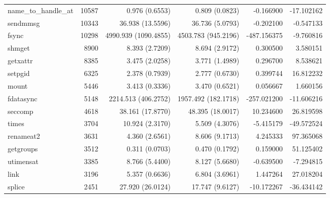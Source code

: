 \begin{longtable}{>{\ttfamily}lrrrrr}
           name\_to\_handle\_at &       10587 &           0.976 (0.6553) &           0.809 (0.0823) &       -0.166900 &   -17.102162 \\
                       sendmmsg &       10343 &         36.938 (13.5596) &          36.736 (5.0793) &       -0.202100 &    -0.547133 \\
                          fsync &       10298 &     4990.939 (1090.4855) &      4503.783 (945.2196) &     -487.156375 &    -9.760816 \\
                         shmget &        8900 &           8.393 (2.7209) &           8.694 (2.9172) &        0.300500 &     3.580151 \\
                       getxattr &        8385 &           3.475 (2.0258) &           3.771 (1.4989) &        0.296700 &     8.538621 \\
                        setpgid &        6325 &           2.378 (0.7939) &           2.777 (0.6730) &        0.399744 &    16.812232 \\
                          mount &        5446 &           3.413 (0.3336) &           3.470 (0.6521) &        0.056667 &     1.660156 \\
                      fdatasync &        5148 &      2214.513 (406.2752) &      1957.492 (182.1718) &     -257.021200 &   -11.606216 \\
                        seccomp &        4618 &         38.161 (17.8770) &         48.395 (18.0017) &       10.234600 &    26.819598 \\
                          times &        3704 &          10.924 (2.3170) &           5.509 (4.3076) &       -5.415179 &   -49.572524 \\
                      renameat2 &        3631 &           4.360 (2.6561) &           8.606 (9.1713) &        4.245333 &    97.365068 \\
                      getgroups &        3512 &           0.311 (0.0703) &           0.470 (0.1792) &        0.159000 &    51.125402 \\
                      utimensat &        3385 &           8.766 (5.4400) &           8.127 (5.6680) &       -0.639500 &    -7.294815 \\
                           link &        3196 &           5.357 (0.6636) &           6.804 (3.6961) &        1.447264 &    27.018204 \\
                         splice &        2451 &         27.920 (26.0124) &          17.747 (9.6127) &      -10.172267 &   -36.434142 \\

\end{longtable}
